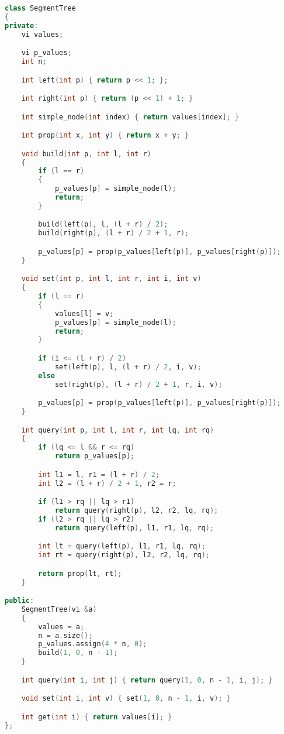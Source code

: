 \documentclass[leter]{amsart}
\begin{document}
\begin{multicols}{2}
\begin{lstlisting}[language=C++]
class SegmentTree
{
private:
    vi values;

    vi p_values;
    int n;

    int left(int p) { return p << 1; };

    int right(int p) { return (p << 1) + 1; }

    int simple_node(int index) { return values[index]; }

    int prop(int x, int y) { return x + y; }

    void build(int p, int l, int r)
    {
        if (l == r)
        {
            p_values[p] = simple_node(l);
            return;
        }

        build(left(p), l, (l + r) / 2);
        build(right(p), (l + r) / 2 + 1, r);

        p_values[p] = prop(p_values[left(p)], p_values[right(p)]);
    }

    void set(int p, int l, int r, int i, int v)
    {
        if (l == r)
        {
            values[l] = v;
            p_values[p] = simple_node(l);
            return;
        }

        if (i <= (l + r) / 2)
            set(left(p), l, (l + r) / 2, i, v);
        else
            set(right(p), (l + r) / 2 + 1, r, i, v);

        p_values[p] = prop(p_values[left(p)], p_values[right(p)]);
    }

    int query(int p, int l, int r, int lq, int rq)
    {
        if (lq <= l && r <= rq)
            return p_values[p];

        int l1 = l, r1 = (l + r) / 2;
        int l2 = (l + r) / 2 + 1, r2 = r;

        if (l1 > rq || lq > r1)
            return query(right(p), l2, r2, lq, rq);
        if (l2 > rq || lq > r2)
            return query(left(p), l1, r1, lq, rq);

        int lt = query(left(p), l1, r1, lq, rq);
        int rt = query(right(p), l2, r2, lq, rq);

        return prop(lt, rt);
    }

public:
    SegmentTree(vi &a)
    {
        values = a;
        n = a.size();
        p_values.assign(4 * n, 0);
        build(1, 0, n - 1);
    }

    int query(int i, int j) { return query(1, 0, n - 1, i, j); }

    void set(int i, int v) { set(1, 0, n - 1, i, v); }

    int get(int i) { return values[i]; }
};

\end{lstlisting}
\end{multicols}
\end{document}
